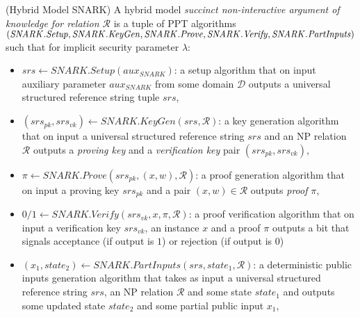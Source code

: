 \begin{definition}(Hybrid Model SNARK)
\label{dfn_snark}
A hybrid model \emph{succinct non-interactive argument of knowledge for relation $\mathcal{R}$} is a tuple of PPT algorithms 
$(\mathit{SNARK.Setup}, \mathit{SNARK.KeyGen}, \mathit{SNARK.Prove}, \\ \mathit{SNARK.Verify}, \mathit{SNARK.PartInputs})$ 
such that for implicit security parameter $\lambda$: 

\begin{itemize}
\item $\mathit{srs} \leftarrow \mathit{SNARK.Setup} (\mathit{aux_{\mathit{SNARK}}})$: a setup algorithm that on input auxiliary parameter 
$\mathit{aux_{\mathit{SNARK}}}$ from some domain $\mathcal{D}$ outputs a universal structured reference string tuple $\mathit{srs}$, 

\item $(\mathit{srs_{pk}}, \mathit{srs_{vk}}) \leftarrow \mathit{SNARK.KeyGen}(\mathit{srs}, \mathcal{R})$: a key generation algorithm that on input a
universal structured reference string $\mathit{srs}$ and an NP relation $\mathcal{R}$ outputs a \emph{proving key} and 
a \emph{verification key} pair $(\mathit{srs_{pk}}, \mathit{srs_{vk}})$,

\item $\pi \leftarrow \mathit{SNARK.Prove}(\mathit{srs_{pk}}, (x,w), \mathcal{R})$: a proof generation algorithm that on input a proving key 
$\mathit{srs_{pk}}$ and a pair $(x,w) \in \mathcal{R}$ outputs \emph{proof} $\pi$, 

\item $0/1 \leftarrow \mathit{SNARK.Verify}(\mathit{srs_{vk}}, x, \pi, \mathcal{R})$: a proof verification algorithm that on input a verification key 
$\mathit{srs_{vk}}$, an instance $x$ and a proof $\pi$ outputs a bit that signals acceptance (if output is $1$) or rejection (if output is $0$)

\item $(x_1, \mathit{state}_2) \leftarrow \mathit{SNARK.PartInputs}(\mathit{srs}, \mathit{state}_1, \mathcal{R})$: a deterministic 
public inputs generation algorithm that takes as input a universal structured reference string $\mathit{srs}$, an NP relation $\mathcal{R}$ and 
some state $\mathit{state}_1$ and outputs some updated state $\mathit{state}_2$ and some partial public input $x_1$,


\end{itemize}
\end{definition}
